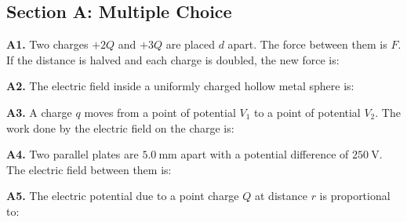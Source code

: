 \newpage
\begin{exercisebox}[21]

\subsection*{Section A: Multiple Choice}

\textbf{A1.} Two charges $+2Q$ and $+3Q$ are placed
$d$ apart. The force between them is $F$. If the
distance is halved and each charge is doubled, the
new force is:


\vspace{0.4cm}

\textbf{A2.} The electric field inside a uniformly
charged hollow metal sphere is:


\vspace{0.4cm}

\textbf{A3.} A charge $q$ moves from a point of
potential $V_1$ to a point of potential $V_2$. The
work done by the electric field on the charge is:


\vspace{0.4cm}

\textbf{A4.} Two parallel plates are $5.0\ \text{mm}$
apart with a potential difference of $250\ \text{V}$.
The electric field between them is:


\vspace{0.4cm}

\textbf{A5.} The electric potential due to a point
charge $Q$ at distance $r$ is proportional to:


\vspace{0.4cm}


\end{exercisebox}
